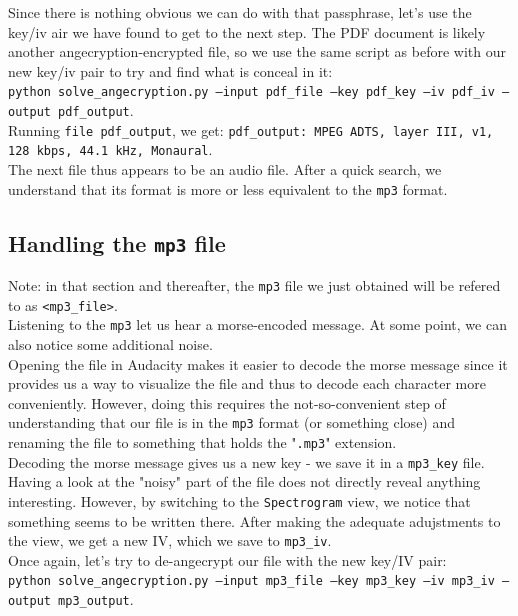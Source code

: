 \documentclass[12pt,a4paper]{article}
\begin{document}
    Since there is nothing obvious we can do with that passphrase, let's use
    the key/iv air we have found to get to the next step. The PDF document is
    likely another angecryption-encrypted file, so we use the same script as
    before with our new key/iv pair to try and find what is conceal in it:\\
    \texttt{python solve\_angecryption.py --input pdf\_file --key pdf\_key --iv
    pdf\_iv --output pdf\_output}.\\

    Running \texttt{file pdf\_output}, we get: \texttt{pdf\_output: MPEG ADTS,
    layer III, v1, 128 kbps, 44.1 kHz, Monaural}.\\
    The next file thus appears to be an audio file. After a quick search, we
    understand that its format is more or less equivalent to the \texttt{mp3} format.


    \subsection{Handling the \texttt{mp3} file}
    Note: in that section and thereafter, the \texttt{mp3} file we just
    obtained will be refered to as \texttt{<mp3\_file>}.\\

    Listening to the \texttt{mp3} let us hear a morse-encoded message. At some
    point, we can also notice some additional noise.\\
    Opening the file in Audacity makes it easier to decode the morse message
    since it provides us a way to visualize the file and thus to decode each
    character more conveniently. However, doing this requires the
    not-so-convenient step of understanding that our file is in the
    \texttt{mp3} format (or something close) and renaming the file to something
    that holds the "\texttt{.mp3}" extension.\\
    Decoding the morse message gives us a new key - we save it
    in a \texttt{mp3\_key} file.\\

    Having a look at the "noisy" part of the file does not directly reveal
    anything interesting. However, by switching to the \texttt{Spectrogram}
    view, we notice that something seems to be written there. After making the
    adequate adujstments to the view, we get a new IV, which we save to
    \texttt{mp3\_iv}.\\

    Once again, let's try to de-angecrypt our file with the new key/IV pair:\\
    \texttt{python solve\_angecryption.py --input mp3\_file --key mp3\_key --iv
    mp3\_iv --output mp3\_output}.
\end{document}
